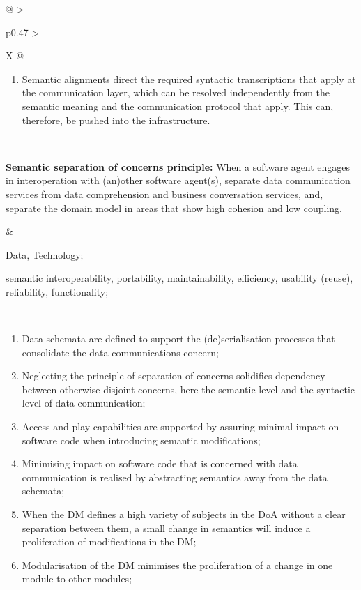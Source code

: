 \begin{xltabular}[l]{\linewidth}{@{} >{\small\raggedright\arraybackslash}p{0.47\linewidth} >{\small\raggedright\arraybackslash}X @{}}
\begin{enumerate}[left=10pt, nosep]
  \item Semantic alignments direct the required syntactic transcriptions that apply at the communication layer, which can be resolved independently from the semantic meaning and the communication protocol that apply. This can, therefore, be pushed into the infrastructure.
\end{enumerate} \\
%
%
%
\begin{mmdp}\label{dp:ssoc}{\bfseries Semantic separation of concerns principle:}
\quad When a software agent engages in interoperation with (an)other software agent(s), separate data communication services from data comprehension and business conversation services, and, separate the domain model in areas that show high cohesion and low coupling. \end{mmdp}
&
\begin{description}[labelwidth=3.7cm,leftmargin=3.7cm+1ex,nosep,topsep=2ex,labelsep=1ex,font=\bfseries]
\item[Type of information:] Data, Technology;
\item[Quality attributes:] semantic interoperability, portability, maintainability, efficiency, usability (reuse), reliability, functionality;
\end{description}
\\
\begin{enumerate}[left=6pt, nosep]
  \item Data schemata are defined to support the (de)serialisation processes that consolidate the data communications concern;
  \item Neglecting the principle of separation of concerns solidifies dependency between otherwise disjoint concerns, here the semantic level and the syntactic level of data communication;
  \item Access-and-play capabilities are supported by assuring minimal impact on software code when introducing semantic modifications;
  \item Minimising impact on software code that is concerned with data communication is realised by abstracting semantics away from the data schemata;
  \item When the DM defines a high variety of subjects in the DoA without a clear separation between them, a small change in semantics will induce a proliferation of modifications in the DM;
  \item Modularisation of the DM minimises the proliferation of a change in one module to other modules;

\end{enumerate}
\end{xltabular}

